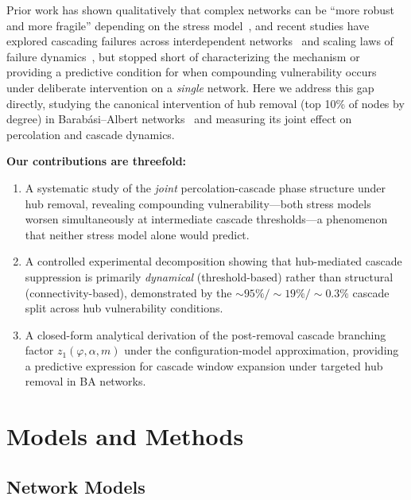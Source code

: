 \documentclass[aps,pre,twocolumn,superscriptaddress,showpacs]{revtex4-2}
\begin{document}
Prior work has shown qualitatively that complex networks can be ``more robust and more fragile'' depending on the stress model~\cite{Albert2000,Callaway2000}, and recent studies have explored cascading failures across interdependent networks~\cite{Valdez2020,Xu2021} and scaling laws of failure dynamics~\cite{Pal2023}, but stopped short of characterizing the mechanism or providing a predictive condition for when compounding vulnerability occurs under deliberate intervention on a \emph{single} network. Here we address this gap directly, studying the canonical intervention of hub removal (top 10\% of nodes by degree) in Barab\'asi--Albert networks~\cite{Barabasi1999} and measuring its joint effect on percolation and cascade dynamics.

\textbf{Our contributions are threefold:}

\begin{enumerate}
\item A systematic study of the \emph{joint} percolation-cascade phase structure under hub removal, revealing compounding vulnerability---both stress models worsen simultaneously at intermediate cascade thresholds---a phenomenon that neither stress model alone would predict.

\item A controlled experimental decomposition showing that hub-mediated cascade suppression is primarily \emph{dynamical} (threshold-based) rather than structural (connectivity-based), demonstrated by the ${\sim}95\%/{\sim}19\%/{\sim}0.3\%$ cascade split across hub vulnerability conditions.

\item A closed-form analytical derivation of the post-removal cascade branching factor $z_1(\varphi, \alpha, m)$ under the configuration-model approximation, providing a predictive expression for cascade window expansion under targeted hub removal in BA networks.
\end{enumerate}

\section{Models and Methods}
\label{sec:methods}

\subsection{Network Models}
\end{document}
